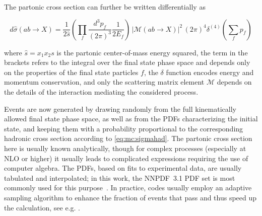 
The partonic cross section can further be written differentially as~\cite{Peskin:1995ev}

\begin{equation}
    d \hat{\sigma} (a b \rightarrow X) = \frac{1}{2 \hat{s}} \left( \prod_f \frac{d^3 p_f}{(2\pi)^3} \frac{1}{2 E_f} \right) \, \left| \mathcal{M} (a b \rightarrow 
    X ) \right|^2 \, (2\pi)^4 \delta^{(4)} \left( \sum_f p_f \right)
\end{equation}

\noindent where $\hat{s} = x_1 x_2 s$ is the partonic center-of-mass energy squared, the term in the brackets refers to the integral over the final state phase space and depends only on the properties of the final state particles $f$, the $\delta$ function encodes energy and momentum conservation, and only the scattering matrix element $\mathcal{M}$ depends on the details of the interaction mediating the considered process.

Events are now generated by drawing randomly from the full kinematically allowed final state phase space, as well as from the PDFs characterizing the initial state, and keeping them with a probability proportional to the corresponding hadronic cross section according to \cref{eq:mc:sigmahad}. The partonic cross section here is usually known analytically, though for complex processes (especially at NLO or higher) it usually leads to complicated expressions requiring the use of computer algebra. The PDFs, based on fits to experimental data, are usually tabulated and interpolated; in this work, the NNPDF~3.1 PDF set is most commonly used for this purpose~\cite{NNPDF:2017mvq}. In practice, codes usually employ an adaptive sampling algorithm to enhance the fraction of events that pass and thus speed up the calculation, see e.g. .

